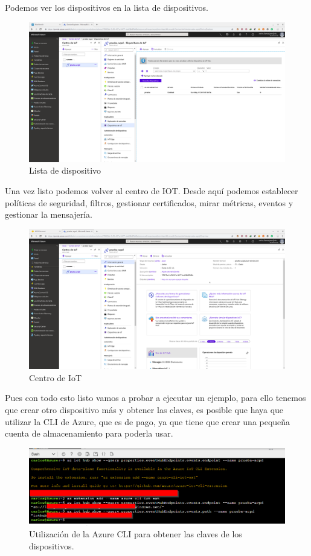 Podemos ver los dispositivos en la lista de dispositivos.


\begin{figure}[h]
	\centering
	\includegraphics[scale=0.2]{iot_azure/dispositivos.png}
	\caption{Lista de dispositivo}
	\label{AZIOT4}
\end{figure}

\newpage
Una vez listo podemos volver al centro de IOT. Desde aquí podemos establecer políticas de seguridad, filtros, gestionar certificados, mirar métricas, eventos y gestionar la mensajería.

\begin{figure}[h]
	\centering
	\includegraphics[scale=0.2]{iot_azure/centro.png}
	\caption{Centro de IoT}
	\label{AZIOT5}
\end{figure}

Pues con todo esto listo vamos a probar a ejecutar un ejemplo, para ello tenemos que crear otro dispositivo más y obtener las claves, es posible que haya que utilizar la CLI de Azure, que es de pago, ya que tiene que crear una pequeña cuenta de almacenamiento para poderla usar.


\begin{figure}[h]
	\centering
	\includegraphics[scale=0.6]{iot_azure/azure_cli.png}
	\caption{Utilización de la Azure CLI para obtener las claves de los dispositivos.}
	\label{AZIOT6}
\end{figure}

